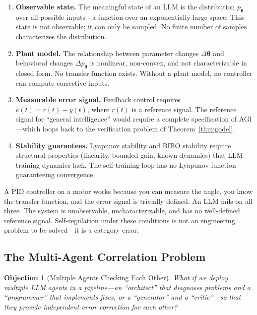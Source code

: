 \documentclass[11pt,a4paper]{article}
\newtheorem{objection}{Objection}
\begin{document}
\begin{enumerate}
    \item \textbf{Observable state.} The meaningful state of an LLM is the distribution $p_{\bm{\theta}}$ over all possible inputs---a function over an exponentially large space. This state is not observable; it can only be sampled. No finite number of samples characterizes the distribution.
    \item \textbf{Plant model.} The relationship between parameter changes $\Delta\bm{\theta}$ and behavioral changes $\Delta p_{\bm{\theta}}$ is nonlinear, non-convex, and not characterizable in closed form. No transfer function exists. Without a plant model, no controller can compute corrective inputs.
    \item \textbf{Measurable error signal.} Feedback control requires $e(t) = r(t) - y(t)$, where $r(t)$ is a reference signal. The reference signal for ``general intelligence'' would require a complete specification of AGI---which loops back to the verification problem of Theorem~\ref{thm:godel}.
    \item \textbf{Stability guarantees.} Lyapunov stability and BIBO stability require structural properties (linearity, bounded gain, known dynamics) that LLM training dynamics lack. The self-training loop has no Lyapunov function guaranteeing convergence.
\end{enumerate}

A PID controller on a motor works because you can measure the angle, you know the transfer function, and the error signal is trivially defined. An LLM fails on all three. The system is unobservable, uncharacterizable, and has no well-defined reference signal. Self-regulation under these conditions is not an engineering problem to be solved---it is a category error.

\subsection{The Multi-Agent Correlation Problem}
\label{sec:multiagent}

\begin{objection}[Multiple Agents Checking Each Other]
What if we deploy multiple LLM agents in a pipeline---an ``architect'' that diagnoses problems and a ``programmer'' that implements fixes, or a ``generator'' and a ``critic''---so that they provide independent error correction for each other?
\end{objection}
\end{document}
